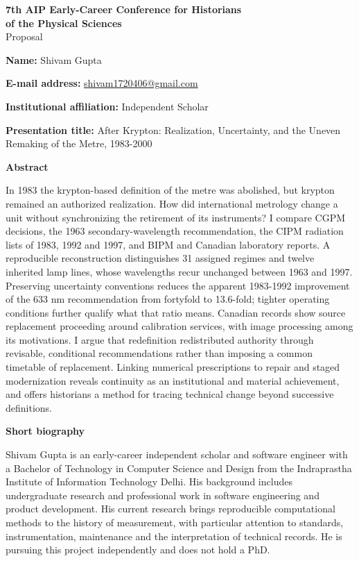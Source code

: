 \documentclass[11pt,a4paper]{article}
\begin{document}
\begin{center}
\textbf{7th AIP Early-Career Conference for Historians\\of the Physical Sciences}\\[5pt]
Proposal
\end{center}
\vspace{5pt}
\textbf{Name:} Shivam Gupta

\textbf{E-mail address:} \href{mailto:shivam1720406@gmail.com}{shivam1720406@gmail.com}

\textbf{Institutional affiliation:} Independent Scholar

\textbf{Presentation title:} After Krypton: Realization, Uncertainty, and the Uneven Remaking of the Metre, 1983-2000

\textbf{Abstract}

In 1983 the krypton-based definition of the metre was abolished, but krypton remained an authorized realization. How did international metrology change a unit without synchronizing the retirement of its instruments? I compare CGPM decisions, the 1963 secondary-wavelength recommendation, the CIPM radiation lists of 1983, 1992 and 1997, and BIPM and Canadian laboratory reports. A reproducible reconstruction distinguishes 31 assigned regimes and twelve inherited lamp lines, whose wavelengths recur unchanged between 1963 and 1997. Preserving uncertainty conventions reduces the apparent 1983-1992 improvement of the 633 nm recommendation from fortyfold to 13.6-fold; tighter operating conditions further qualify what that ratio means. Canadian records show source replacement proceeding around calibration services, with image processing among its motivations. I argue that redefinition redistributed authority through revisable, conditional recommendations rather than imposing a common timetable of replacement. Linking numerical prescriptions to repair and staged modernization reveals continuity as an institutional and material achievement, and offers historians a method for tracing technical change beyond successive definitions.

\textbf{Short biography}

Shivam Gupta is an early-career independent scholar and software engineer with a Bachelor of Technology in Computer Science and Design from the Indraprastha Institute of Information Technology Delhi. His background includes undergraduate research and professional work in software engineering and product development. His current research brings reproducible computational methods to the history of measurement, with particular attention to standards, instrumentation, maintenance and the interpretation of technical records. He is pursuing this project independently and does not hold a PhD.
\end{document}
